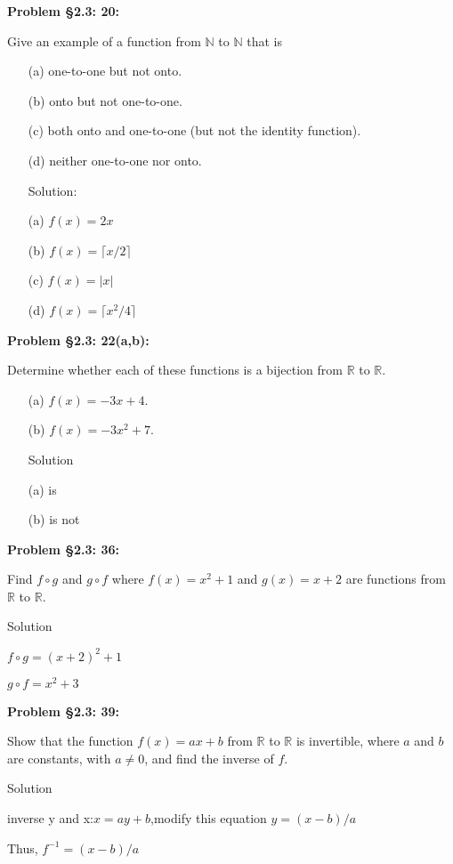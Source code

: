 \documentclass{article}
\newenvironment{problem}[1]
{\begin{mdframed}[default]
\textbf{Problem #1:}
}
{\end{mdframed}
}
\begin{document}
\begin{problem}{\S 2.3: 20}
Give an example of a function from $\mathbb{N}$ to $\mathbb{N}$ that is
\begin{enumerate}
\item[(a)] one-to-one but not onto.
\item[(b)] onto but not one-to-one.
\item[(c)] both onto and one-to-one (but not the identity function).
\item[(d)] neither one-to-one nor onto.

Solution:
\item[(a)] $f(x)=2x$
\item[(b)] $f(x)=\lceil x/2 \rceil$
\item[(c)] $f(x)=|x|$
\item[(d)] $f(x)=\lceil x^2/4 \rceil$
\end{enumerate}
\end{problem}
\begin{problem}{\S 2.3: 22(a,b)}
Determine whether each of these functions is a bijection from $\mathbb{R}$ to $\mathbb{R}$.
\begin{enumerate}
\item[(a)] $f(x) = -3x + 4$.
\item[(b)] $f(x) = -3x^2 + 7$.

Solution
\item[(a)] is
\item[(b)] is not
\end{enumerate}
\end{problem}
\begin{problem}{\S 2.3: 36}
Find $f \circ g$ and $g \circ f$ where $f(x) = x^2 + 1$ and $g(x) = x+2$ are
functions from $\mathbb{R}$ to $\mathbb{R}$.

Solution

$f \circ g = (x+2)^2+1$

$g \circ f = x^2+3$
\end{problem}
\begin{problem}{\S 2.3: 39}
Show that the function $f(x) = ax + b$ from $\mathbb{R}$ to $\mathbb{R}$ is
invertible, where $a$ and $b$ are constants, with $a \neq 0$, and find the inverse
of $f$.

Solution

inverse y and x:$x=ay+b$,modify this equation $y={(x-b)}/a$

Thus, $f^{-1}={(x-b)}/{a}$
\end{problem}
\end{document}

